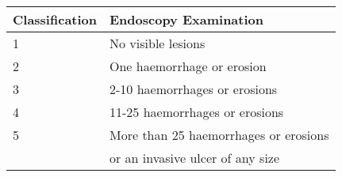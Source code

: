 
\begin{center}
\begin{tabular}{ll}
Classification & Endoscopy Examination \\ \hline
1 & No visible lesions \\
2 & One haemorrhage or erosion \\
3 & 2-10 haemorrhages or erosions \\
4 & 11-25 haemorrhages or erosions \\
5 & More than 25 haemorrhages or erosions \\ 
  & or an invasive ulcer of any size\\ \hline
\end{tabular}
\end{center}
